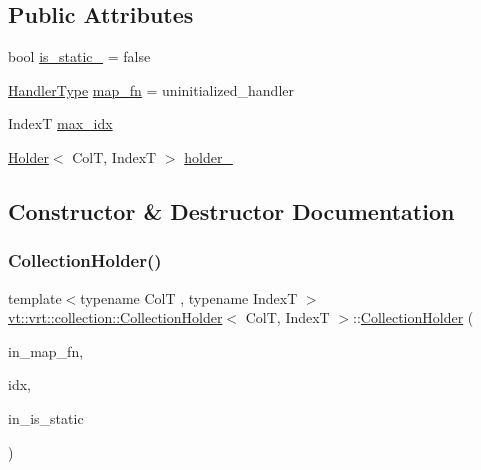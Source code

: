 \subsection*{Public Attributes}
\begin{DoxyCompactItemize}
\item 
bool \hyperlink{structvt_1_1vrt_1_1collection_1_1_collection_holder_ab8d1f8570cd85775b2c8317255827dae}{is\+\_\+static\+\_\+} = false
\item 
\hyperlink{namespacevt_af64846b57dfcaf104da3ef6967917573}{Handler\+Type} \hyperlink{structvt_1_1vrt_1_1collection_1_1_collection_holder_a1bacbcdc0af1d6a69abf890304c78233}{map\+\_\+fn} = uninitialized\+\_\+handler
\item 
IndexT \hyperlink{structvt_1_1vrt_1_1collection_1_1_collection_holder_a1d6e15b6f578ae048c11c2c367651f00}{max\+\_\+idx}
\item 
\hyperlink{structvt_1_1vrt_1_1collection_1_1_holder}{Holder}$<$ ColT, IndexT $>$ \hyperlink{structvt_1_1vrt_1_1collection_1_1_collection_holder_ae553cc92f33cac4493cafd32b4350743}{holder\+\_\+}
\end{DoxyCompactItemize}


\subsection{Constructor \& Destructor Documentation}
\mbox{\label{structvt_1_1vrt_1_1collection_1_1_collection_holder_a75bb95393ac580b3f330da43e295a47a}} 
\subsubsection{\texorpdfstring{Collection\+Holder()}{CollectionHolder()}}
{\footnotesize\ttfamily template$<$typename ColT , typename IndexT $>$ \\
\hyperlink{structvt_1_1vrt_1_1collection_1_1_collection_holder}{vt\+::vrt\+::collection\+::\+Collection\+Holder}$<$ ColT, IndexT $>$\+::\hyperlink{structvt_1_1vrt_1_1collection_1_1_collection_holder}{Collection\+Holder} (\begin{DoxyParamCaption}\item[{\hyperlink{namespacevt_af64846b57dfcaf104da3ef6967917573}{Handler\+Type} const \&}]{in\+\_\+map\+\_\+fn,  }\item[{IndexT const \&}]{idx,  }\item[{bool const}]{in\+\_\+is\+\_\+static }\end{DoxyParamCaption})}

